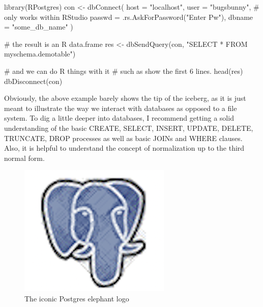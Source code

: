 \documentclass[
  12pt,
  letterpaper,
]{krantz}
\newenvironment{Shaded}{\begin{snugshade}}{\end{snugshade}}
\newcommand{\AttributeTok}[1]{\textcolor[rgb]{0.40,0.45,0.13}{#1}}
\newcommand{\CommentTok}[1]{\textcolor[rgb]{0.37,0.37,0.37}{#1}}
\newcommand{\FunctionTok}[1]{\textcolor[rgb]{0.28,0.35,0.67}{#1}}
\newcommand{\NormalTok}[1]{\textcolor[rgb]{0.00,0.23,0.31}{#1}}
\newcommand{\OtherTok}[1]{\textcolor[rgb]{0.00,0.23,0.31}{#1}}
\newcommand{\StringTok}[1]{\textcolor[rgb]{0.13,0.47,0.30}{#1}}
\begin{document}
\normalsize

\begin{Shaded}
\begin{Highlighting}[]
\FunctionTok{library}\NormalTok{(RPostgres)}
\NormalTok{con }\OtherTok{\textless{}{-}} \FunctionTok{dbConnect}\NormalTok{(}
  \AttributeTok{host =} \StringTok{"localhost"}\NormalTok{,}
  \AttributeTok{user =} \StringTok{"bugsbunny"}\NormalTok{,}
  \CommentTok{\# only works within RStudio}
  \AttributeTok{passwd =} \FunctionTok{.rs.AskForPassword}\NormalTok{(}\StringTok{"Enter Pw"}\NormalTok{), }
  \AttributeTok{dbname =} \StringTok{"some\_db\_name"}
\NormalTok{)}

\CommentTok{\# the result is an R data.frame}
\NormalTok{res }\OtherTok{\textless{}{-}} \FunctionTok{dbSendQuery}\NormalTok{(con,}
 \StringTok{"SELECT * FROM myschema.demotable"}\NormalTok{)}

\CommentTok{\# and we can do R things with it}
\CommentTok{\# such as show the first 6 lines.}
\FunctionTok{head}\NormalTok{(res)}
\FunctionTok{dbDisconnect}\NormalTok{(con)}
\end{Highlighting}
\end{Shaded}

\normalsize

Obviously, the above example barely shows the tip of the iceberg, as it
is just meant to illustrate the way we interact with
databases as opposed to a file system. To dig a little
deeper into databases, I recommend getting a solid
understanding of the basic CREATE, SELECT, INSERT, UPDATE, DELETE,
TRUNCATE, DROP processes as well as basic JOINs and WHERE clauses. Also,
it is helpful to understand the concept of normalization up to the third
normal form.

\begin{figure}

{\centering \includegraphics{./images/postgres.png}

}

\caption{The iconic Postgres elephant logo}

\end{figure}
\end{document}
